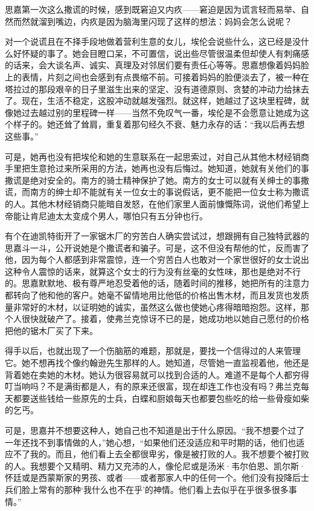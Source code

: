\par 思嘉第一次这么撒谎的时候，感到既窘迫又内疚——窘迫是因为谎言轻而易举、自然而然就溜到嘴边，内疚是因为脑海里闪现了这样的想法：妈妈会怎么说呢？
\par 对一个说谎且在不择手段地做着营利生意的女儿，埃伦会说些什么，这已经是没什么好怀疑的事了。她会目瞪口呆，不可置信，说出些尽管很温柔但却使人有刺痛感的话来，会大谈名声、诚实、真理及对邻居们要有责任心等等。思嘉想像着妈妈脸上的表情，片刻之间也会感到有点畏缩不前。可接着妈妈的脸便淡去了，被一种在塔拉过的那段艰辛的日子里滋生出来的坚定、没有道德原则、贪婪的冲动力给抹去了。现在，生活不稳定，这股冲动就越发强烈。就这样，她越过了这块里程碑，就像她过去越过别的里程碑一样——当然不免叹气一番，埃伦是不会愿意让她成为这个样子的。她还耸了耸肩，重复着那句经久不衰、魅力永存的话：“我以后再去想这些事。”
\par 可是，她再也没有把埃伦和她的生意联系在一起思索过，对自己从其他木材经销商手里把生意抢过来所采用的方法，她再也没有后悔过。她知道，她就有关他们的事撒谎是绝对安全的。南方的骑士精神保护了她。南方的女士可以就有关绅士的事撒谎，而南方的绅士却不能就有关一位女士的事说假话，更不能把一位女士称为撒谎的人。其他木材经销商只能暗自发怒，在他们家里人面前慷慨陈词，说他们希望上帝能让肯尼迪太太变成个男人，哪怕只有五分钟也行。
\par 有个在迪凯特街开了一家锯木厂的穷苦白人确实尝试过，想跟拥有自己独特武器的思嘉斗一斗，公开说她是个撒谎者和骗子。可是，这不但没有帮他的忙，反而害了他，因为每个人都感到非常震惊，连一个穷苦白人也敢对一个家世很好的女士说出这种令人震惊的话来，就算这个女士的行为没有丝毫的女性味，那也是绝对不行的。思嘉默默地、极有尊严地忍受着他的话，随着时间的推移，她把所有的注意力都转向了他和他的客户。她毫不留情地用比他低的价格出售木材，而且发货也发质量非常好的木材，以证明她的诚实，虽然这么做也使她心疼得暗暗抱怨。这样，那个人很快就破产了。接着，使弗兰克惊讶不已的是，她成功地以她自己愿付的价格把他的锯木厂买了下来。
\par 得手以后，也就出现了一个伤脑筋的难题，那就是，要找一个信得过的人来管理它。她不想再找个像约翰逊先生那样的人。她知道，尽管她一直监视着他，他还是背着她在卖她的木材。她认为很容易就可以找到合适的人。难道不是每个人都穷得叮当响吗？不是满街都是人，有的原来还很富，现在却连工作也没有吗？弗兰克每天都要送些钱给一些原先的士兵，白蝶和厨娘每天也都要包些吃的给一些骨瘦如柴的乞丐。
\par 可是，思嘉并不想要这种人，她自己也不知道是出于什么原因。“我不想要个过了一年还找不到事情做的人，”她心想，“如果他们还没适应和平时期的话，他们也适应不了我的。而且，他们看上去全都很卑劣，像是被打败的人。我不想要个被打败的人。我想要个又精明、精力又充沛的人，像伦尼或是汤米·韦尔伯恩、凯尔斯·怀廷或是西蒙斯家的男孩、或者——或者那家人中的任何一个。他们没有投降后士兵们脸上常有的那种‘我什么也不在乎’的神情。他们看上去似乎在乎很多很多事情。”
